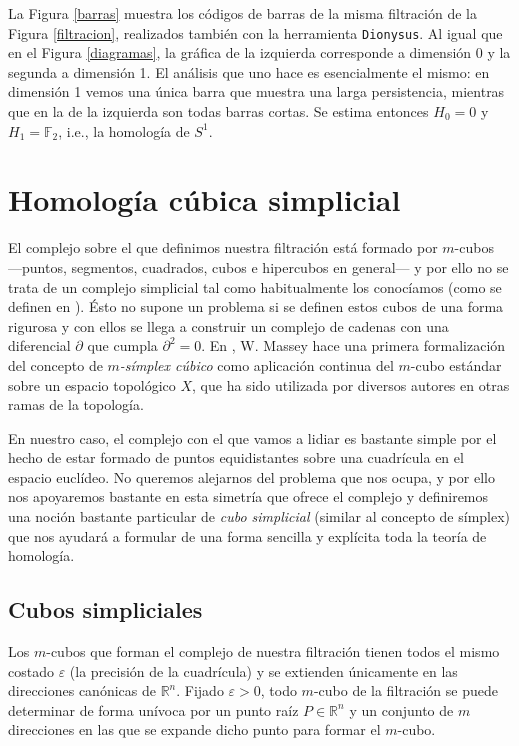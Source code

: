\documentclass[12pt,a4paper,twoside]{article} %
\theoremstyle{plain}
\theoremstyle{definition}
\newcommand{\R}{\mathbb{R}}
\newcommand{\F}{\mathbb{F}}
\begin{document}
La Figura \ref{barras} muestra los códigos de barras de la misma filtración de la Figura \ref{filtracion}, realizados también con la herramienta \texttt{Dionysus}. Al igual que en el Figura \ref{diagramas}, la gráfica de la izquierda corresponde a dimensión 0 y la segunda a dimensión 1. El análisis que uno hace es esencialmente el mismo: en dimensión 1 vemos una única barra que muestra una larga persistencia, mientras que en la de la izquierda son todas barras cortas. Se estima entonces $H_0=0$ y $H_1=\F_2$, i.e., la homología de $S^1$.



\newpage
\section{Homología cúbica simplicial}

%
%

El complejo sobre el que definimos nuestra filtración está formado por $m$-cubos ---puntos, segmentos, cuadrados, cubos e hipercubos en general--- y por ello no se trata de un complejo simplicial tal como habitualmente los conocíamos (como se definen en \cite{Navarro}). Ésto no supone un problema si se definen estos cubos de una forma rigurosa y con ellos se llega a construir un complejo de cadenas con una diferencial $\partial$ que cumpla $\partial^2=0$. En \cite{Massey}, W. Massey hace una primera formalización del concepto de \emph{$m$-símplex cúbico} como aplicación continua del $m$-cubo estándar sobre un espacio topológico $X$, que ha sido utilizada por diversos autores en otras ramas de la topología.

En nuestro caso, el complejo con el que vamos a lidiar es bastante simple por el hecho de estar formado de puntos equidistantes sobre una cuadrícula en el espacio euclídeo. No queremos alejarnos del problema que nos ocupa, y por ello nos apoyaremos bastante en esta simetría que ofrece el complejo y definiremos una noción bastante particular de \emph{cubo simplicial} (similar al concepto de símplex) que nos ayudará a formular de una forma sencilla y explícita toda la teoría de homología.

\subsection{Cubos simpliciales}

Los $m$-cubos que forman el complejo de nuestra filtración tienen todos el mismo costado $\varepsilon$ (la precisión de la cuadrícula) y se extienden únicamente en las direcciones canónicas de $\R^n$. Fijado $\varepsilon > 0$, todo $m$-cubo de la filtración se puede determinar de forma unívoca por un punto raíz $P\in \R^n$ y un conjunto de $m$ direcciones en las que se expande dicho punto para formar el $m$-cubo.
\end{document}
